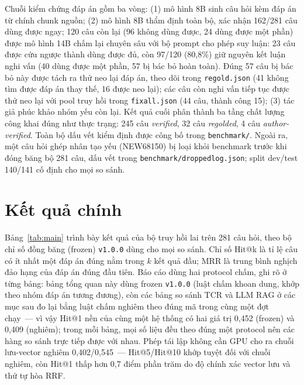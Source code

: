 \documentclass[12pt,a4paper]{report}
\renewcommand{\_}{\textunderscore\allowbreak}
\begin{document}
Chuỗi kiểm chứng đáp án gồm ba vòng: (1) mô hình 8B sinh câu hỏi kèm đáp án từ chính chunk nguồn; (2) mô hình 8B thẩm định toàn bộ, xác nhận 162/281 câu dùng được ngay; 120 câu còn lại (96 không dùng được, 24 dùng được một phần) được mô hình 14B chấm lại chuyên sâu với bộ prompt cho phép suy luận: 23 câu được cứu ngược thành dùng được đủ, còn 97/120 (80,8\%) giữ nguyên kết luận nghi vấn (40 dùng được một phần, 57 bị bác bỏ hoàn toàn). Đúng 57 câu bị bác bỏ này được tách ra thử neo lại đáp án, theo dõi trong \texttt{regold.json} (41 không tìm được đáp án thay thế, 16 được neo lại); các câu còn nghi vấn tiếp tục được thử neo lại với pool truy hồi trong \texttt{fixall.json} (44 câu, thành công 15); (3) tác giả phúc khảo nhóm yếu còn lại. Kết quả cuối phân thành ba tầng chất lượng công khai đúng như thực trạng: 245 câu \emph{verified}, 32 câu \emph{regolded}, 4 câu \emph{author-verified}. Toàn bộ dấu vết kiểm định được công bố trong \texttt{benchmark/}. Ngoài ra, một câu hỏi ghép nhân tạo yếu (NEW68150) bị loại khỏi benchmark trước khi đóng băng bộ 281 câu, dấu vết trong \texttt{benchmark/dropped\_log.json}; split dev/test 140/141 cố định cho mọi so sánh.

\section{Kết quả chính}\label{sec:results}

Bảng~\ref{tab:main} trình bày kết quả của bộ truy hồi lai trên 281 câu hỏi, theo bộ chỉ số đồng băng (frozen) \texttt{v1.0.0} dùng cho mọi so sánh. Chỉ số Hit@k là tỉ lệ câu có ít nhất một đáp án đúng nằm trong $k$ kết quả đầu; MRR là trung bình nghịch đảo hạng của đáp án đúng đầu tiên. Báo cáo dùng hai protocol chấm, ghi rõ ở từng bảng: bảng tổng quan này dùng frozen \texttt{v1.0.0} (luật chấm khoan dung, khớp theo nhóm đáp án tương đương), còn các bảng so sánh TCR và LLM RAG ở các mục sau đo lại bằng luật chấm nghiêm theo đúng mã trong cùng một đợt chạy~--- vì vậy Hit@1 nền của cùng một hệ thống có hai giá trị 0,452 (frozen) và 0,409 (nghiêm); trong mỗi bảng, mọi số liệu đều theo đúng một protocol nên các hàng so sánh trực tiếp được với nhau. Phép tái lập không cần GPU cho ra chuỗi lưu-vector nghiêm 0,402/0,545~--- Hit@5/Hit@10 khớp tuyệt đối với chuỗi nghiêm, còn Hit@1 thấp hơn 0,7 điểm phần trăm do độ chính xác vector lưu và thứ tự hòa RRF.
\end{document}
